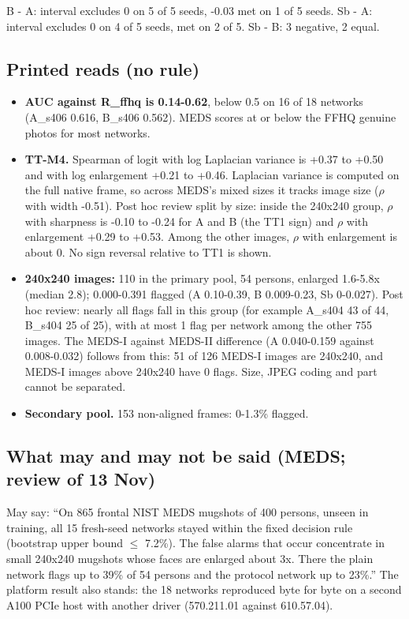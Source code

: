 \documentclass[10pt,twocolumn,letterpaper]{article}
\providecommand{\tightlist}{\setlength{\itemsep}{0pt}\setlength{\parskip}{0pt}}
\begin{document}
B - A: interval excludes 0 on 5 of 5 seeds, -0.03 met on 1 of 5 seeds. Sb - A: interval excludes 0 on 4 of 5 seeds, met on 2 of 5. Sb - B: 3 negative, 2 equal.

\subsection{Printed reads (no rule)}\label{printed-reads-no-rule-1}

\begin{itemize}
\tightlist
\item
  \textbf{AUC against R\_ffhq is 0.14-0.62}, below 0.5 on 16 of 18 networks (A\_s406 0.616, B\_s406 0.562). MEDS scores at or below the FFHQ genuine photos for most networks.
\item
  \textbf{TT-M4.} Spearman of logit with log Laplacian variance is +0.37 to +0.50 and with log enlargement +0.21 to +0.46. Laplacian variance is computed on the full native frame, so across MEDS's mixed sizes it tracks image size (\(\rho\) with width -0.51). Post hoc review split by size: inside the 240x240 group, \(\rho\) with sharpness is -0.10 to -0.24 for A and B (the TT1 sign) and \(\rho\) with enlargement +0.29 to +0.53. Among the other images, \(\rho\) with enlargement is about 0. No sign reversal relative to TT1 is shown.
\item
  \textbf{240x240 images:} 110 in the primary pool, 54 persons, enlarged 1.6-5.8x (median 2.8); 0.000-0.391 flagged (A 0.10-0.39, B 0.009-0.23, Sb 0-0.027). Post hoc review: nearly all flags fall in this group (for example A\_s404 43 of 44, B\_s404 25 of 25), with at most 1 flag per network among the other 755 images. The MEDS-I against MEDS-II difference (A 0.040-0.159 against 0.008-0.032) follows from this: 51 of 126 MEDS-I images are 240x240, and MEDS-I images above 240x240 have 0 flags. Size, JPEG coding and part cannot be separated.
\item
  \textbf{Secondary pool.} 153 non-aligned frames: 0-1.3\% flagged.
\end{itemize}

\subsection{What may and may not be said (MEDS; review of 13 Nov)}\label{what-may-and-may-not-be-said-meds-review-of-13-nov}

May say: ``On 865 frontal NIST MEDS mugshots of 400 persons, unseen in training, all 15 fresh-seed networks stayed within the fixed decision rule (bootstrap upper bound \(\le\) 7.2\%). The false alarms that occur concentrate in small 240x240 mugshots whose faces are enlarged about 3x. There the plain network flags up to 39\% of 54 persons and the protocol network up to 23\%.'' The platform result also stands: the 18 networks reproduced byte for byte on a second A100 PCIe host with another driver (570.211.01 against 610.57.04).
\end{document}
